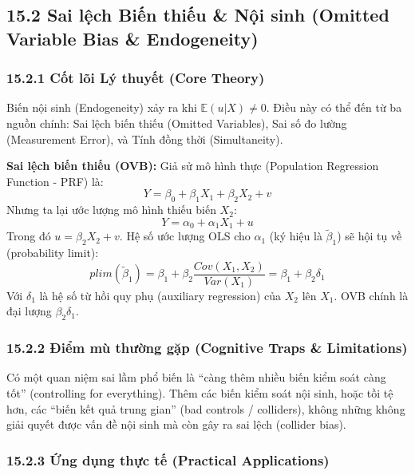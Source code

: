 \documentclass[
]{article}
\begin{document}
\subsection{15.2 Sai lệch Biến thiếu \& Nội sinh (Omitted Variable Bias
\&
Endogeneity)}\label{sai-lux1ec7ch-biux1ebfn-thiux1ebfu-nux1ed9i-sinh-omitted-variable-bias-endogeneity}

\subsubsection{15.2.1 Cốt lõi Lý thuyết (Core
Theory)}\label{cux1ed1t-luxf5i-luxfd-thuyux1ebft-core-theory-47}

Biến nội sinh (Endogeneity) xảy ra khi \(\mathbb{E}(u|X) \neq 0\). Điều
này có thể đến từ ba nguồn chính: Sai lệch biến thiếu (Omitted
Variables), Sai số đo lường (Measurement Error), và Tính đồng thời
(Simultaneity).

\textbf{Sai lệch biến thiếu (OVB):} Giả sử mô hình thực (Population
Regression Function - PRF) là:
\[ Y = \beta_0 + \beta_1 X_1 + \beta_2 X_2 + v \] Nhưng ta lại ước lượng
mô hình thiếu biến \(X_2\): \[ Y = \alpha_0 + \alpha_1 X_1 + u \] Trong
đó \(u = \beta_2 X_2 + v\). Hệ số ước lượng OLS cho \(\alpha_1\) (ký
hiệu là \(\tilde{\beta}_1\)) sẽ hội tụ về (probability limit):
\[ plim(\tilde{\beta}_1) = \beta_1 + \beta_2 \frac{Cov(X_1, X_2)}{Var(X_1)} = \beta_1 + \beta_2 \delta_{1} \]
Với \(\delta_1\) là hệ số từ hồi quy phụ (auxiliary regression) của
\(X_2\) lên \(X_1\). OVB chính là đại lượng \(\beta_2 \delta_{1}\).

\subsubsection{15.2.2 Điểm mù thường gặp (Cognitive Traps \&
Limitations)}\label{ux111iux1ec3m-muxf9-thux1b0ux1eddng-gux1eb7p-cognitive-traps-limitations-98}

Có một quan niệm sai lầm phổ biến là ``càng thêm nhiều biến kiểm soát
càng tốt'' (controlling for everything). Thêm các biến kiểm soát nội
sinh, hoặc tồi tệ hơn, các ``biến kết quả trung gian'' (bad controls /
colliders), không những không giải quyết được vấn đề nội sinh mà còn gây
ra sai lệch (collider bias).

\subsubsection{15.2.3 Ứng dụng thực tế (Practical
Applications)}\label{ux1ee9ng-dux1ee5ng-thux1ef1c-tux1ebf-practical-applications-54}
\end{document}

